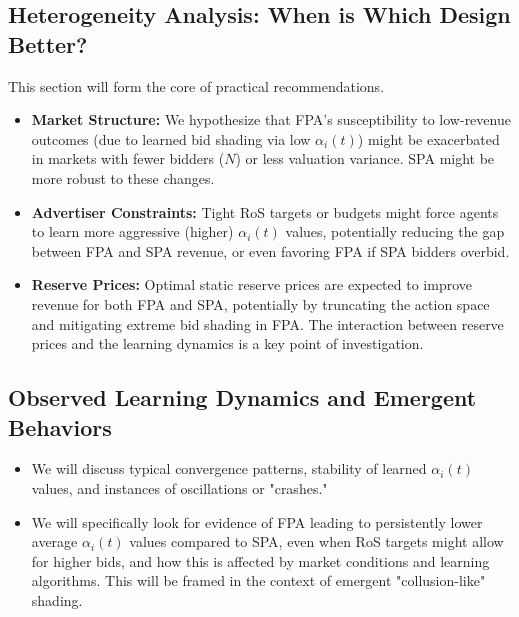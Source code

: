 \documentclass[12pt, a4paper]{article}
\begin{document}
\subsection{Heterogeneity Analysis: When is Which Design Better?}
This section will form the core of practical recommendations.
\begin{itemize}
    \item \textbf{Market Structure:} We hypothesize that FPA's susceptibility to low-revenue outcomes (due to learned bid shading via low $\alpha_i(t)$) might be exacerbated in markets with fewer bidders ($N$) or less valuation variance. SPA might be more robust to these changes.
    \item \textbf{Advertiser Constraints:} Tight RoS targets or budgets might force agents to learn more aggressive (higher) $\alpha_i(t)$ values, potentially reducing the gap between FPA and SPA revenue, or even favoring FPA if SPA bidders overbid.
    \item \textbf{Reserve Prices:} Optimal static reserve prices are expected to improve revenue for both FPA and SPA, potentially by truncating the action space and mitigating extreme bid shading in FPA. The interaction between reserve prices and the learning dynamics is a key point of investigation.
\end{itemize}

\subsection{Observed Learning Dynamics and Emergent Behaviors}
\begin{itemize}
    \item We will discuss typical convergence patterns, stability of learned $\alpha_i(t)$ values, and instances of oscillations or "crashes."
    \item We will specifically look for evidence of FPA leading to persistently lower average $\alpha_i(t)$ values compared to SPA, even when RoS targets might allow for higher bids, and how this is affected by market conditions and learning algorithms. This will be framed in the context of emergent "collusion-like" shading.
\end{itemize}
\end{document}
